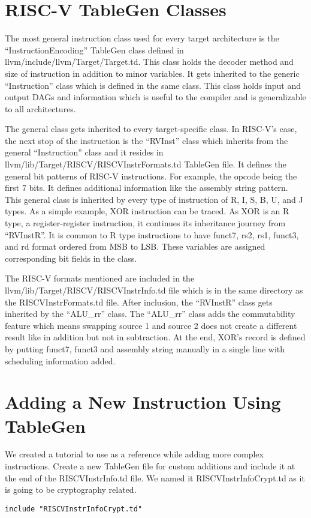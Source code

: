 \section{RISC-V TableGen Classes}
The most general instruction class used for every target architecture is the “InstructionEncoding” TableGen class defined in llvm/include/llvm/Target/Target.td. This class holds the decoder method and size of instruction in addition to minor variables. It gets inherited to the generic “Instruction” class which is defined in the same class. This class holds input and output DAGs and information which is useful to the compiler and is generalizable to all architectures.
\par

The general class gets inherited to every target-specific class. In RISC-V’s case, the next stop of the instruction is the “RVInst” class which inherits from the general “Instruction” class and it resides in llvm/lib/Target/RISCV/RISCVInstrFormats.td TableGen file. It defines the general bit patterns of RISC-V instructions. For example, the opcode being the first 7 bits. It defines additional information like the assembly string pattern. This general class is inherited by every type of instruction of R, I, S, B, U, and J types. As a simple example, XOR instruction can be traced. As XOR is an R type, a register-register instruction, it continues its inheritance journey from “RVInstR”. It is common to R type instructions to have funct7, rs2, rs1, funct3, and rd format ordered from MSB to LSB. These variables are assigned corresponding bit fields in the class. 
\par

The RISC-V formats mentioned are included in the llvm/lib/Target/RISCV/RISCVInstrInfo.td file which is in the same directory as the RISCVInstrFormats.td file. After inclusion, the “RVInstR” class gets inherited by the “ALU\_rr” class. The “ALU\_rr” class adds the commutability feature which means swapping source 1 and source 2 does not create a different result like in addition but not in subtraction. At the end, XOR’s record is defined by putting funct7, funct3 and assembly string manually in a single line with scheduling information added. 

\section{Adding a New Instruction Using TableGen}\label{sec:MLA_add_section}
We created a tutorial to use as a reference while adding more complex instructions.
Create a new TableGen file for custom additions and include it at the end of the RISCVInstrInfo.td file. We named it RISCVInstrInfoCrypt.td as it is going to be cryptography related.
\begin{lstlisting}[caption= Include file]
include "RISCVInstrInfoCrypt.td"
\end{lstlisting}

